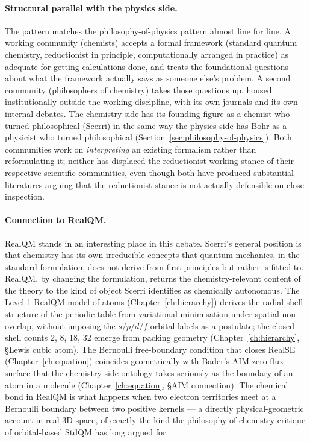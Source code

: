 \paragraph{Structural parallel with the physics side.}
The pattern matches the philosophy-of-physics pattern almost line for line. A working community (chemists) accepts a formal framework (standard quantum chemistry, reductionist in principle, computationally arranged in practice) as adequate for getting calculations done, and treats the foundational questions about what the framework actually says as someone else's problem. A second community (philosophers of chemistry) takes those questions up, housed institutionally outside the working discipline, with its own journals and its own internal debates. The chemistry side has its founding figure as a chemist who turned philosophical (Scerri) in the same way the physics side has Bohr as a physicist who turned philosophical (Section~\ref{sec:philosophy-of-physics}). Both communities work on \emph{interpreting} an existing formalism rather than reformulating it; neither has displaced the reductionist working stance of their respective scientific communities, even though both have produced substantial literatures arguing that the reductionist stance is not actually defensible on close inspection.

\paragraph{Connection to RealQM.}
RealQM stands in an interesting place in this debate. Scerri's general position is that chemistry has its own irreducible concepts that quantum mechanics, in the standard formulation, does not derive from first principles but rather is fitted to. RealQM, by changing the formulation, returns the chemistry-relevant content of the theory to the kind of object Scerri identifies as chemically autonomous. The Level-1 RealQM model of atoms (Chapter~\ref{ch:hierarchy}) derives the radial shell structure of the periodic table from variational minimisation under spatial non-overlap, without imposing the $s/p/d/f$ orbital labels as a postulate; the closed-shell counts 2, 8, 18, 32 emerge from packing geometry (Chapter~\ref{ch:hierarchy}, §Lewis cubic atom). The Bernoulli free-boundary condition that closes RealSE (Chapter~\ref{ch:equation}) coincides geometrically with Bader's AIM zero-flux surface that the chemistry-side ontology takes seriously as the boundary of an atom in a molecule (Chapter~\ref{ch:equation}, §AIM connection). The chemical bond in RealQM is what happens when two electron territories meet at a Bernoulli boundary between two positive kernels --- a directly physical-geometric account in real 3D space, of exactly the kind the philosophy-of-chemistry critique of orbital-based StdQM has long argued for.

